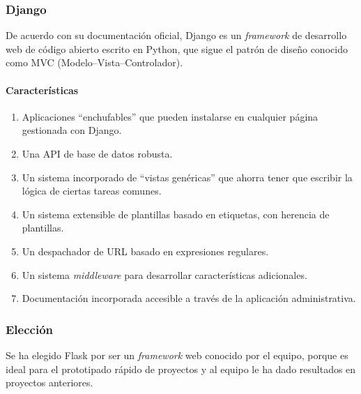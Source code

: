 \subsubsection*{Django}

De acuerdo con su documentación oficial\cite{projects_flask_2020}, Django es un \textit{framework} de desarrollo web de código abierto escrito en Python, que sigue el patrón de diseño conocido como MVC (Modelo–Vista–Controlador).

\paragraph*{Características}
\begin{enumerate}
    \item Aplicaciones ``enchufables'' que pueden instalarse en cualquier página gestionada con Django.
    \item Una API de base de datos robusta.
    \item Un sistema incorporado de ``vistas genéricas'' que ahorra tener que escribir la lógica de ciertas tareas comunes.
    \item Un sistema extensible de plantillas basado en etiquetas, con herencia de plantillas.
    \item Un despachador de URL basado en expresiones regulares.
    \item Un sistema \textit{middleware} para desarrollar características adicionales.
    \item Documentación incorporada accesible a través de la aplicación administrativa.
\end{enumerate}

\subsubsection*{Elección}

Se ha elegido Flask por ser un \textit{framework} web conocido por el equipo, porque es ideal para el prototipado rápido de proyectos y al equipo le ha dado resultados en proyectos anteriores.